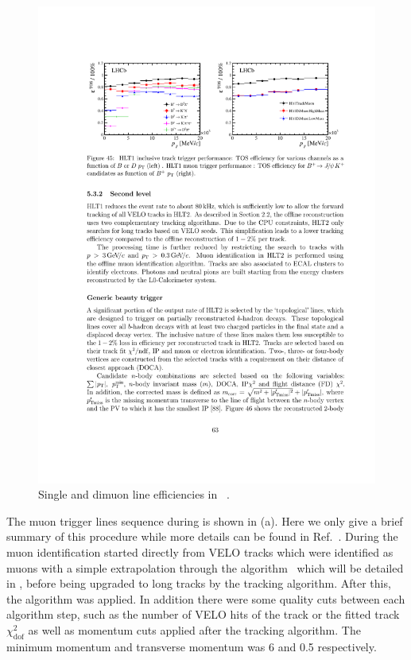 \begin{figure}[h!]
  \centering
  \includegraphics[trim=11cm 20.5cm 2cm 3cm, clip=true,scale=1.]{Figures/Chapter3/hlt1_muon_eff_run1.pdf}
  \caption{ Single and dimuon \hltone line efficiencies in \runone ~\cite{LHCb-PROC-2014-005}. }
  \label{fig:hlt1_eff_run1}
\end{figure}


The \hltone muon trigger lines sequence during \runone is shown in (a).
Here we only give a brief summary of this procedure while more details can be found in Ref.~\cite{LHCb-PUB-2011-017}.
During \runone the muon identification started directly from VELO tracks
which were identified as muons with a simple extrapolation through the \mvm algorithm~\cite{LHCb-PUB-2011-017}
which will be detailed in ,
before being upgraded to long tracks by the \FwD tracking algorithm.
After this, the  algorithm was applied.
In addition there were some quality cuts between each algorithm step, such as the number of VELO hits
of the track or the fitted track $\chi^2_{\text {dof}}$ as well as momentum cuts applied after the \FwD tracking algorithm.
The minimum momentum and transverse momentum was 6 \gevc and 0.5 \gevc respectively.

